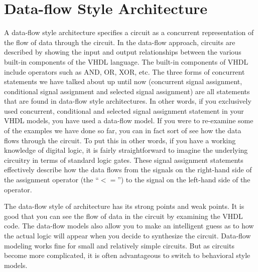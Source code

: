 \section{Data-flow Style Architecture}
A data-flow style architecture specifies a circuit as a concurrent representation of the flow of data through the circuit. In the data-flow approach, circuits are described by showing the input and output relationships between the various built-in components of the VHDL language. The built-in components of VHDL include operators such as AND, OR, XOR, etc. The three forms of concurrent statements we have talked about up until now (concurrent signal assignment, conditional signal assignment and selected signal assignment) are all statements that are found in data-flow style architectures. In other words, if you exclusively used concurrent, conditional and selected signal assignment statement in your VHDL models, you have used a data-flow model. If you were to re-examine some of the examples we have done so far, you can in fact sort of see how the data flows through the circuit. To put this in other words, if you have a working knowledge of digital logic, it is fairly straightforward to imagine the underlying circuitry in terms of standard logic gates. These signal assignment statements effectively describe how the data flows from the signals on the right-hand side of the assignment operator (the ``{\footnotesize$<=$}'') to the signal on the left-hand side of the operator. 

The data-flow style of architecture has its strong points and weak points. It is good that you can see the flow of data in the circuit by examining the VHDL code. The data-flow models also allow you to make an intelligent guess as to how the actual logic will appear when you decide to synthesize the circuit. Data-flow modeling works fine for small and relatively simple circuits. But as circuits become more complicated, it is often advantageous to switch to behavioral style models.

